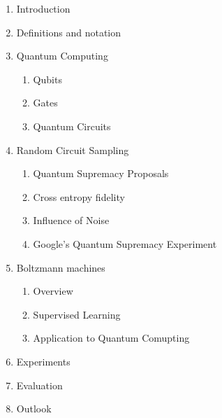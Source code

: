 \begin{enumerate}
  \item Introduction
  \item Definitions and notation
  \item Quantum Computing
  \begin{enumerate}
    \item Qubits 
    \item Gates
    \item Quantum Circuits
  \end{enumerate}
  \item Random Circuit Sampling
  \begin{enumerate}
    \item Quantum Supremacy Proposals 
    \item Cross entropy fidelity
    \item Influence of Noise
    \item Google's Quantum Supremacy Experiment
  \end{enumerate}
  \item Boltzmann machines
  \begin{enumerate}
    \item Overview
    \item Supervised Learning
    \item Application to Quantum Comupting
  \end{enumerate}
  \item Experiments
  \item Evaluation
  \item Outlook
\end{enumerate}